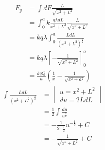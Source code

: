 \documentclass{article}
\begin{document}
\begin{align}
  F_y & = {\int}dF\frac{L}{\sqrt{x^2+L^2}}                                     \\
      & = \int_{0}^{a}k\frac{q{\lambda}dL}{x^2+L^2}\frac{L}{\sqrt{x^2+L^2}}    \\
      & = kq{\lambda}\int_{0}^{a}\frac{L dL}{\left(x^2+L^2\right)^\frac{3}{2}} \\
      & = kq{\lambda}\left[-\frac{1}{\sqrt{x^2+L^2}}\right]_{0}^{a}            \\
      & = \frac{kqQ}{a}\left(\frac{1}{x} - \frac{1}{\sqrt{x^2+a^2}}\right)
\end{align}
\begin{align}
  \int\frac{L dL}{\left(x^2+L^2\right)^\frac{3}{2}}
   & = \begin{vmatrix}
         u = x^2+L^2 \\
         du = 2LdL
       \end{vmatrix}                                   \\
   & = \frac{1}{2}\int\frac{du}{u^\frac{3}{2}}          \\
   & = -\frac{1}{2\cdot\frac{1}{2}}u^{-\frac{1}{2}} + C \\
   & = -\frac{1}{\sqrt{x^2+L^2}} + C
\end{align}
\end{document}

